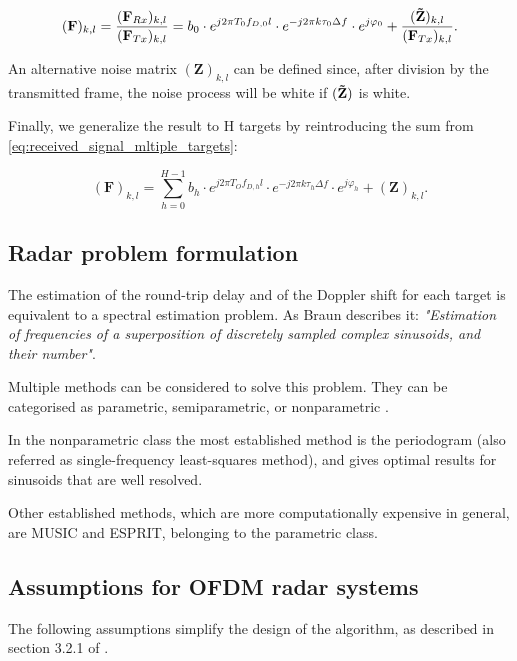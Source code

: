     \begin{equation}
        (\mathbf F)_{k,l} = \frac{(\mathbf F_{Rx})_{k,l}}{(\mathbf F_{Tx})_{k,l}} = b_0 \cdot e^{j2\pi T_0 f_{D,0} l}\cdot e^{-j2\pi k \tau_0 \Delta f} \cdot e^{j\varphi_0} + \frac{(\mathbf{\Tilde{Z}})_{k,l}}{(\mathbf F_{Tx})_{k,l}}\label{eq:CSI_frame}.    
    \end{equation}
    
    An alternative noise matrix $(\mathbf{Z})_{k,l}$ can be defined since, after division by the transmitted frame, the noise process will be white if $(\mathbf{\Tilde{Z}})$ is white.
    
    Finally, we generalize the result to H targets by reintroducing the sum from \ref{eq:received_signal_mltiple_targets}:
    
    \begin{equation}
        (\mathbf F)_{k,l} =  \sum_{h=0}^{H-1} b_h \cdot e^{j2\pi T_O f_{D,h} l}\cdot e^{-j2\pi k \tau_h \Delta f} \cdot e^{j\varphi_h} + (\mathbf{Z})_{k,l}.
    \end{equation}
    
    \subsection{Radar problem formulation}
    
    The estimation of the round-trip delay and of the Doppler shift for each target is equivalent to a spectral estimation problem. As Braun describes it: \textit{"Estimation of frequencies of a superposition of discretely sampled complex sinusoids, and their number"}.
    
    Multiple methods can be considered to solve this problem. They can be categorised as parametric, semiparametric, or nonparametric \cite{Stoica_New_Method_Parameter_Estimation}. 
    
    In the nonparametric class the most established method is the periodogram (also referred as single-frequency least-squares method), and gives optimal results for sinusoids that are well resolved.
    
    Other established methods, which are more computationally expensive in general, are MUSIC and ESPRIT, belonging to the parametric class.
    
    \subsection{Assumptions for OFDM radar systems}
    \label{sub:assumptions_ofdm_radar}
    The following assumptions simplify the design of the algorithm, as described in section 3.2.1 of \cite{Braun2014OFDMRA}.
    
